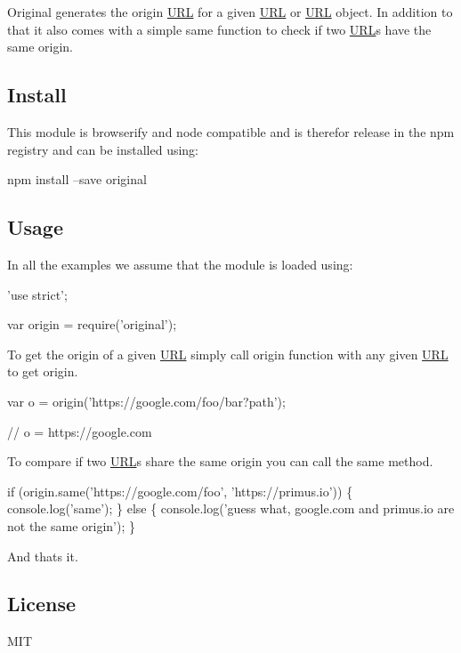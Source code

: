\href{http://unshift.io}{\tt }\href{http://browsenpm.org/package/original}{\tt }\href{https://travis-ci.org/unshiftio/original}{\tt }\href{https://david-dm.org/unshiftio/original}{\tt }\href{https://coveralls.io/r/unshiftio/original?branch=master}{\tt }\href{http://webchat.freenode.net/?channels=unshift}{\tt }

Original generates the origin \mbox{\hyperlink{namespace_u_r_l}{U\+RL}} for a given \mbox{\hyperlink{namespace_u_r_l}{U\+RL}} or \mbox{\hyperlink{namespace_u_r_l}{U\+RL}} object. In addition to that it also comes with a simple {\ttfamily same} function to check if two \mbox{\hyperlink{namespace_u_r_l}{U\+RL}}\textquotesingle{}s have the same origin.

\subsection*{Install}

This module is browserify and node compatible and is therefor release in the npm registry and can be installed using\+:


\begin{DoxyCode}
npm install --save original
\end{DoxyCode}


\subsection*{Usage}

In all the examples we assume that the module is loaded using\+:


\begin{DoxyCode}
'use strict';

var origin = require('original');
\end{DoxyCode}


To get the origin of a given \mbox{\hyperlink{namespace_u_r_l}{U\+RL}} simply call {\ttfamily origin} function with any given \mbox{\hyperlink{namespace_u_r_l}{U\+RL}} to get origin.


\begin{DoxyCode}
var o = origin('https://google.com/foo/bar?path');

// o = https://google.com
\end{DoxyCode}


To compare if two \mbox{\hyperlink{namespace_u_r_l}{U\+RL}}\textquotesingle{}s share the same origin you can call the {\ttfamily same} method.


\begin{DoxyCode}
if (origin.same('https://google.com/foo', 'https://primus.io')) \{
  console.log('same');
\} else \{
  console.log('guess what, google.com and primus.io are not the same origin');
\}
\end{DoxyCode}


And that\textquotesingle{}s it.

\subsection*{License}

M\+IT 